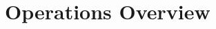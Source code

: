 \documentclass[preprint]{aastex631}
\begin{document}
\section{Operations Overview}
\label{sec:operations}
%



{}



\end{document}
